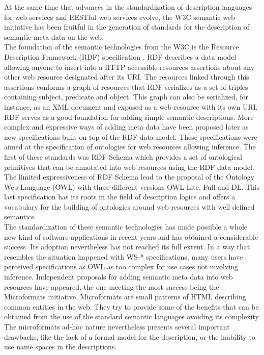 At the same time that advances in the standardization of description languages for web services and RESTful web services evolve,
the W3C semantic web initiative has been fruitful in the generation of standards for the description of semantic
meta data on the web.\\

The foundation of the semantic technologies from the W3C is the Resource Description Framework (RDF) specification \cite{Hayes:04:RS}. RDF describes a
data model allowing anyone to insert into a HTTP accessible resources assertions about any other web resource designated
after its URI. The resources linked through this assertions conforms a graph of resources that RDF serializes as a set
of triples containing subject, predicate and object. This graph can also be serialized, for instance,  as an XML document \cite{rdfxml} and
exposed as a web resource with its own URI. RDF serves as a good foundation for adding simple semantic
descriptions. More complex and expressive ways of adding meta data  have been proposed later as new specifications built
on top of the RDF data model. These specifications were aimed at the specification of ontologies for web resources
allowing inference. The first of these standards was RDF Schema \cite{Brickley:04:RVD} which provides a set of ontological primitives that can be
annotated into web resources using the RDF data model. The limited expressiveness of RDF Schema lead to the proposal of the
Ontology Web Language (OWL) \cite{Dean:04:OWO} with three different versions OWL Lite, Full and DL. This last specification has
its roots in the field of description logics and offers a vocabulary for the building of ontologies around web
resources with well defined semantics.\\

The standardization of these semantic technologies has made possible a whole new kind of software applications in recent
years and has obtained a considerable success. Its adoption nevertheless has not reached its full extent. In a way that
resembles the situation happened with WS-* specifications, many users have perceived specifications as OWL as too complex for
use cases not involving inference. Independent proposals for adding semantic meta data into web resources have appeared,
the one meeting the most success being the Microformats initiative. Microformats are small patterns of HTML describing
common entities in the web. They try to provide some of the benefits that can be obtained from the use of the standard
semantic languages avoiding its complexity. The microformats ad-hoc nature nevertheless presents several important drawbacks,
like the lack of a formal model for the description, or the inability to use name spaces in the descriptions.\\

